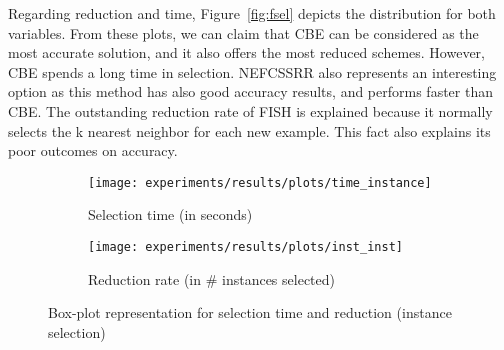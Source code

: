 \documentclass[preprint,12pt]{elsarticle}
\begin{document}
\begin{table}[!htp]
\renewcommand{\arraystretch}{1.3}
\centering
\scriptsize
\caption{Wilcoxon test results and average rankings of methods (Friedman Procedure \& Adjusted p-value with Holm's Test) for accuracy}
\label{tab:wilcoxon-isel}
\end{table}

Regarding reduction and time, Figure~\ref{fig:fsel} depicts the distribution for both variables. From these plots, we can claim that CBE can be considered as the most accurate solution, and it also offers the most reduced schemes. However, CBE spends a long time in selection. NEFCSSRR also represents an interesting option as this method has also good accuracy results, and performs faster than CBE. The outstanding reduction rate of FISH is explained because it normally selects the k nearest neighbor for each new example. This fact also explains its poor outcomes on accuracy.

\begin{figure}
\begin{subfigure}{.5\textwidth}
  \centering
  \texttt{[image: experiments/results/plots/time\_instance]}
  \caption{Selection time (in seconds)}
  \label{fig:time-isel}
\end{subfigure}%
\begin{subfigure}{.5\textwidth}
  \centering
  \texttt{[image: experiments/results/plots/inst\_inst]}
  \caption{Reduction rate (in \# instances selected)}
  \label{fig:inst-isel}
\end{subfigure}
\caption{Box-plot representation for selection time and reduction (instance selection)}
\label{fig:isel}
\end{figure}
\end{document}
